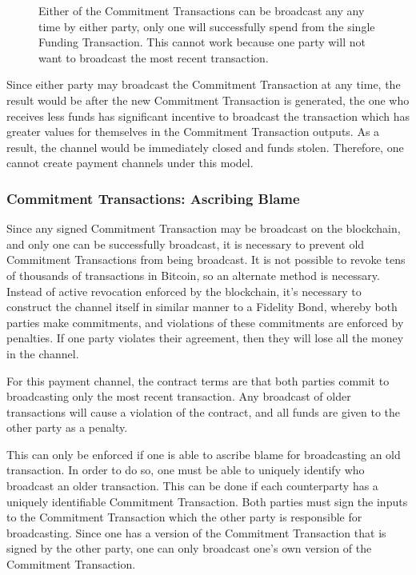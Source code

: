 \documentclass[letterpaper,11pt]{article}
\begin{document}
\begin{figure}[H]
	\caption{Either of the Commitment Transactions can be broadcast any any
		time by either party, only one will successfully spend from the
		single Funding Transaction. This cannot work because one party
		will not want to broadcast the most recent transaction.
	}
\end{figure}

Since either party may broadcast the Commitment Transaction at any time, the
result would be after the new Commitment Transaction is generated, the one who
receives less funds has significant incentive to broadcast the transaction which
has greater values for themselves in the Commitment Transaction outputs. As a
result, the channel would be immediately closed and funds stolen. Therefore,
one cannot create payment channels under this model.

\subsubsection{Commitment Transactions: Ascribing Blame}

Since any signed Commitment Transaction may be broadcast on the blockchain, and
only one can be successfully broadcast, it is necessary to prevent old
Commitment Transactions from being broadcast. It is not possible to revoke tens
of thousands of transactions in Bitcoin, so an alternate method is necessary.
Instead of active revocation enforced by the blockchain, it's necessary to
construct the channel itself in similar manner to a Fidelity Bond, whereby both
parties make commitments, and violations of these commitments are enforced by
penalties. If one party violates their agreement, then they will lose all the
money in the channel.

For this payment channel, the contract terms are that both parties commit to
broadcasting only the most recent transaction. Any broadcast of older
transactions will cause a violation of the contract, and all funds are given to
the other party as a penalty.

This can only be enforced if one is able to ascribe blame for broadcasting an
old transaction. In order to do so, one must be able to uniquely identify who
broadcast an older transaction. This can be done if each counterparty has a
uniquely identifiable Commitment Transaction. Both parties must sign the inputs
to the Commitment Transaction which the other party is responsible for
broadcasting. Since one has a version of the Commitment Transaction that is
signed by the other party, one can only broadcast one's own version of the
Commitment Transaction.
\end{document}
